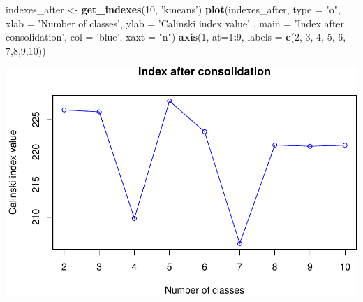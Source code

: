 \documentclass[]{article}
\newenvironment{Shaded}{\begin{snugshade}}{\end{snugshade}}
\newcommand{\KeywordTok}[1]{\textcolor[rgb]{0.13,0.29,0.53}{\textbf{#1}}}
\newcommand{\DataTypeTok}[1]{\textcolor[rgb]{0.13,0.29,0.53}{#1}}
\newcommand{\DecValTok}[1]{\textcolor[rgb]{0.00,0.00,0.81}{#1}}
\newcommand{\StringTok}[1]{\textcolor[rgb]{0.31,0.60,0.02}{#1}}
\newcommand{\OperatorTok}[1]{\textcolor[rgb]{0.81,0.36,0.00}{\textbf{#1}}}
\newcommand{\NormalTok}[1]{#1}
\begin{document}
\begin{Shaded}
\begin{Highlighting}[]
\NormalTok{indexes_after <-}\StringTok{ }\KeywordTok{get_indexes}\NormalTok{(}\DecValTok{10}\NormalTok{, }\StringTok{'kmeans'}\NormalTok{)}
\KeywordTok{plot}\NormalTok{(indexes_after, }\DataTypeTok{type =} \StringTok{"o"}\NormalTok{, }\DataTypeTok{xlab =} \StringTok{'Number of classes'}\NormalTok{, }\DataTypeTok{ylab =} \StringTok{'Calinski index value'}
\NormalTok{, }\DataTypeTok{main =} \StringTok{'Index after consolidation'}\NormalTok{, }\DataTypeTok{col =} \StringTok{'blue'}\NormalTok{, xaxt}
\NormalTok{=}\StringTok{ "n"}\NormalTok{)}
\KeywordTok{axis}\NormalTok{(}\DecValTok{1}\NormalTok{, }\DataTypeTok{at=}\DecValTok{1}\OperatorTok{:}\DecValTok{9}\NormalTok{, }\DataTypeTok{labels =} \KeywordTok{c}\NormalTok{(}\DecValTok{2}\NormalTok{, }\DecValTok{3}\NormalTok{, }\DecValTok{4}\NormalTok{, }\DecValTok{5}\NormalTok{, }\DecValTok{6}\NormalTok{, }\DecValTok{7}\NormalTok{,}\DecValTok{8}\NormalTok{,}\DecValTok{9}\NormalTok{,}\DecValTok{10}\NormalTok{))  }
\end{Highlighting}
\end{Shaded}

\includegraphics{project_report_files/figure-latex/unnamed-chunk-19-1.pdf}
\end{document}
